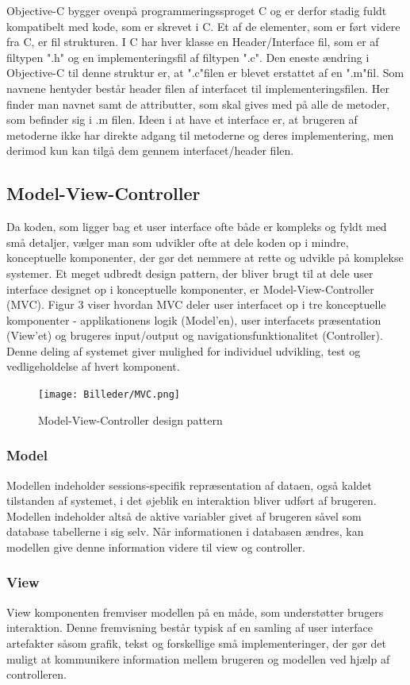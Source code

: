 \documentclass[a4paper,10pt,titlepage]{article}
\begin{document}
Objective-C bygger ovenpå programmeringssproget C og er derfor stadig fuldt kompatibelt med kode, som er skrevet i C. Et af de elementer, som er ført videre fra C, er fil strukturen. I C har hver klasse en Header/Interface fil, som er af filtypen ".h" og en implementeringsfil af filtypen ".c". Den eneste ændring i Objective-C til denne struktur er, at ".c"filen er blevet erstattet af en ".m"fil. Som navnene hentyder består header filen af interfacet til implementeringsfilen. Her finder man navnet samt de attributter, som skal gives med på alle de metoder, som befinder sig i .m filen. Ideen i at have et interface er, at brugeren af metoderne ikke har direkte adgang til metoderne og deres implementering, men derimod kun kan tilgå dem gennem interfacet/header filen. \parencite[side 71-85]{Teach}

\subsection{Model-View-Controller}
Da koden, som ligger bag et user interface ofte både er kompleks og fyldt med små detaljer, vælger man som udvikler ofte at dele koden op i mindre, konceptuelle komponenter, der gør det nemmere at rette og udvikle på komplekse systemer. Et meget udbredt design pattern, der bliver brugt til at dele user interface designet op i konceptuelle komponenter, er Model-View-Controller (MVC). Figur 3 viser hvordan MVC deler user interfacet op i tre konceptuelle komponenter - applikationens logik (Model'en), user interfacets præsentation (View'et) og brugeres input/output og navigationsfunktionalitet (Controller). Denne deling af systemet giver mulighed for individuel udvikling, test og vedligeholdelse af hvert komponent.\parencite[side 207]{MVC}
\begin{figure}[H]
\centering\texttt{[image: Billeder/MVC.png]}
\caption{Model-View-Controller design pattern \parencite{MVCPic}}
\end{figure}
\subsubsection*{Model}
Modellen indeholder sessions-specifik repræsentation af dataen, også kaldet tilstanden af systemet, i det øjeblik en interaktion bliver udført af brugeren. Modellen indeholder altså de aktive variabler givet af brugeren såvel som database tabellerne i sig selv. Når informationen i databasen ændres, kan modellen give denne information videre til view og controller.\parencite[side 207]{MVC}
\subsubsection*{View}
View komponenten fremviser modellen på en måde, som understøtter brugers interaktion. Denne fremvisning består typisk af en samling af user interface artefakter såsom grafik, tekst og forskellige små implementeringer, der gør det muligt at kommunikere information mellem brugeren og modellen ved hjælp af controlleren. \parencite[side 207]{MVC}
\end{document}
